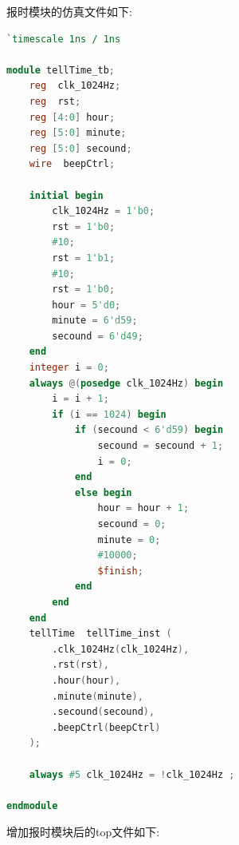 \documentclass{article}
\begin{document}
报时模块的仿真文件如下:
\begin{lstlisting}[language=Verilog, caption={报时模块仿真文件}]
`timescale 1ns / 1ns

module tellTime_tb;
    reg  clk_1024Hz;
    reg  rst;
    reg [4:0] hour;
    reg [5:0] minute;
    reg [5:0] secound;
    wire  beepCtrl;

    initial begin
        clk_1024Hz = 1'b0;
        rst = 1'b0;
        #10;
        rst = 1'b1;
        #10;
        rst = 1'b0;
        hour = 5'd0;
        minute = 6'd59;
        secound = 6'd49;
    end
    integer i = 0;
    always @(posedge clk_1024Hz) begin
        i = i + 1;
        if (i == 1024) begin
            if (secound < 6'd59) begin
                secound = secound + 1;
                i = 0;
            end
            else begin
                hour = hour + 1;
                secound = 0;
                minute = 0;
                #10000;
                $finish;
            end
        end
    end
    tellTime  tellTime_inst (
        .clk_1024Hz(clk_1024Hz),
        .rst(rst),
        .hour(hour),
        .minute(minute),
        .secound(secound),
        .beepCtrl(beepCtrl)
    );

    always #5 clk_1024Hz = !clk_1024Hz ;

endmodule
\end{lstlisting}
增加报时模块后的top文件如下:
\end{document}
